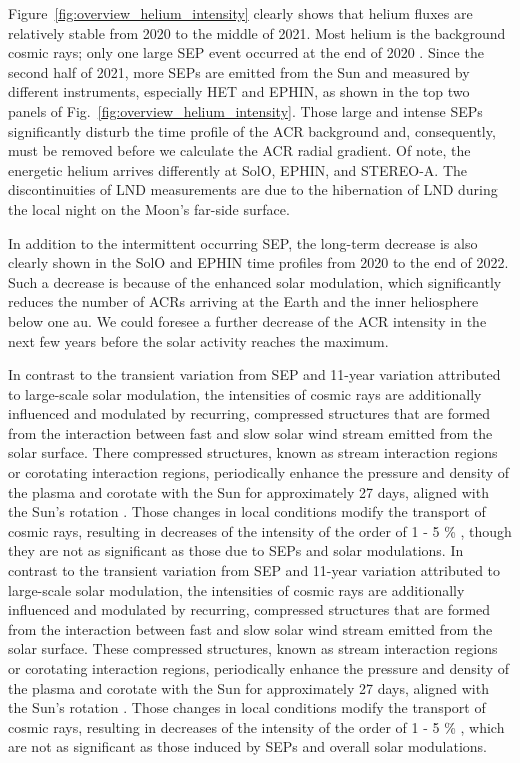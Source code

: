 Figure~\ref{fig:overview_helium_intensity} clearly shows that helium fluxes are relatively stable from 2020 to the middle of 2021. Most helium is the background cosmic rays; only one large \ac{SEP} event occurred at the end of 2020 \cite{Kolhoff2021AA}. 
Since the second half of 2021, more \acp{SEP} are emitted from the Sun and measured by different instruments, especially \ac{HET} and \ac{EPHIN}, as shown in the top two panels of Fig.~\ref{fig:overview_helium_intensity}.
Those large and intense \acp{SEP} significantly disturb the time profile of the \ac{ACR} background and, consequently, must be removed before we calculate the \ac{ACR} radial gradient. 
Of note, the energetic helium arrives differently at \ac{SolO}, \ac{EPHIN}, and \ac{STEREO}-A. The discontinuities of \ac{LND} measurements are due to the hibernation of \ac{LND} during the local night on the Moon's far-side surface.


In addition to the intermittent occurring \ac{SEP}, the long-term decrease is also clearly shown in the \ac{SolO} and \ac{EPHIN} time profiles from 2020 to the end of 2022. Such a decrease is because of the enhanced solar modulation, which significantly reduces the number of \acp{ACR} arriving at the Earth and the inner heliosphere below one au. We could foresee a further decrease of the \ac{ACR} intensity in the next few years before the solar activity reaches the maximum.

In contrast to the transient variation from \ac{SEP} and 11-year variation attributed to large-scale solar modulation, the intensities of cosmic rays are additionally influenced and modulated by recurring, compressed structures that are formed from the interaction between fast and slow solar wind stream emitted from the solar surface. There compressed structures, known as stream interaction regions or corotating interaction regions, periodically enhance the pressure and density of the plasma and corotate with the Sun for approximately 27 days, aligned with the Sun's rotation \citep{Burlaga1974JGR, Gosling1976JGR, Richardson2004SSRv}. Those changes in local conditions modify the transport of cosmic rays, resulting in decreases of the intensity of the order of 1 - 5 \% \citep{}, though they are not as significant as those due to \acp{SEP} and solar modulations.
In contrast to the transient variation from \ac{SEP} and 11-year variation attributed to large-scale solar modulation, the intensities of cosmic rays are additionally influenced and modulated by recurring, compressed structures that are formed from the interaction between fast and slow solar wind stream emitted from the solar surface. These compressed structures, known as stream interaction regions or corotating interaction regions, periodically enhance the pressure and density of the plasma and corotate with the Sun for approximately 27 days, aligned with the Sun's rotation \citep{Burlaga1974JGR, Gosling1976JGR, Richardson2004SSRv}. Those changes in local conditions modify the transport of cosmic rays, resulting in decreases of the intensity of the order of 1 - 5 \% \citep{Richardson2004SSRv}, which are not as significant as those induced by \acp{SEP} and overall solar modulations.

